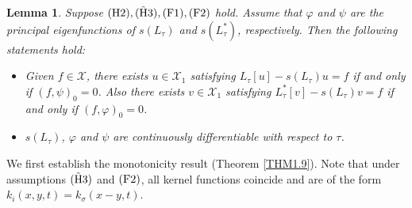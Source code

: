 \documentclass[11pt,reqno]{amsart}
\newtheorem{lemma}[theorem]{Lemma}
\numberwithin{equation}{section}
\begin{document}
\begin{lemma}
Suppose ${\rm (H2),(\tilde{H}3), (F1), (F2)}$ hold.
Assume that $\varphi$ and $\psi$ are the principal eigenfunctions of $s(L_{\tau})$ and $s(L^{*}_{\tau})$, respectively. Then the following statements hold:
\begin{itemize}[leftmargin=0.9cm]
\item[$(i)$]
Given $f\in\mathcal{X}$, there exists $u\in\mathcal{X}_{1}$ satisfying $L_{\tau}[u] - s(L_{\tau})u = f$ if and only if
$(f,\psi)_{0} = 0$.
Also there exists $v\in\mathcal{X}_{1}$ satisfying $L^{*}_{\tau}[v] - s(L_{\tau})v = f$ if and only if
$(f,\varphi)_{0} = 0$.

\item[$(ii)$]
$s(L_{\tau})$, $\varphi$ and $\psi$ are continuously differentiable with respect to $\tau$.
\end{itemize}
\end{lemma}

We first establish the monotonicity result (Theorem \ref{THM1.9}). Note that under assumptions ${\rm (\tilde{H}3) }$ and ${\rm (F2)}$, all kernel functions coincide and are of the form $k_{i}(x,y,t)=k_{\sigma}(x-y,t)$.
\end{document}
